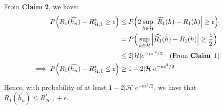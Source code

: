 \begin{solution*}
\begin{itemize}
\noindent From \textbf{Claim 2}, we have:
\begin{align*}
    P\Big( 
        R_1(\widehat{h_n}) - R^*_{\mathcal{H}, 1} \ge \epsilon
     \Big) 
    &\le
    P\Big( 
        2\sup_{h\in\mathcal{H}} \Big| 
            \widehat{R_1}(h) - R_1(h) 
         \Big| \ge \epsilon
     \Big)  \\
    &= P\Big( 
        \sup_{h\in\mathcal{H}} \Big| 
            \widehat{R_1}(h) - R_1(h) 
         \Big| \ge \frac{\epsilon}{2}
     \Big)  \\
    &\le 2|\mathcal{H}|e^{-n\epsilon^2/2} \ \ \ (\text{From }\textbf{Claim 1}) \\
    \implies 
    P\Big( 
        R_1(\widehat{h_n}) - R^*_{\mathcal{H}, 1} \le \epsilon
     \Big) &\ge 1 - 2|\mathcal{H}|e^{-n\epsilon^2/2} 
\end{align*}

\noindent Hence, with probability of at least $1 - 2|\mathcal{H}|e^{-n\epsilon^2/2}$, we have that $R_1(\widehat{h_n}) \le R^*_{\mathcal{H}, 1} + \epsilon$.

\end{itemize}
\end{solution*}